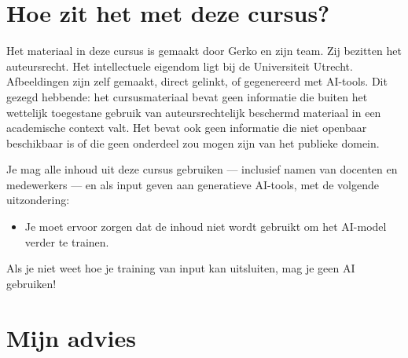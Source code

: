 \documentclass[
  letterpaper,
  DIV=11,
  numbers=noendperiod]{scrreprt}
\providecommand{\tightlist}{%
  \setlength{\itemsep}{0pt}\setlength{\parskip}{0pt}}
\begin{document}
\section*{Hoe zit het met deze
cursus?}\label{hoe-zit-het-met-deze-cursus}


Het materiaal in deze cursus is gemaakt door Gerko en zijn team. Zij
bezitten het auteursrecht. Het intellectuele eigendom ligt bij de
Universiteit Utrecht. Afbeeldingen zijn zelf gemaakt, direct gelinkt, of
gegenereerd met AI-tools. Dit gezegd hebbende: het cursusmateriaal bevat
geen informatie die buiten het wettelijk toegestane gebruik van
auteursrechtelijk beschermd materiaal in een academische context valt.
Het bevat ook geen informatie die niet openbaar beschikbaar is of die
geen onderdeel zou mogen zijn van het publieke domein.

\begin{tcolorbox}[enhanced jigsaw, arc=.35mm, bottomrule=.15mm, bottomtitle=1mm, breakable, colback=white, colbacktitle=quarto-callout-warning-color!10!white, colframe=quarto-callout-warning-color-frame, coltitle=black, left=2mm, leftrule=.75mm, opacityback=0, opacitybacktitle=0.6, rightrule=.15mm, title=\textcolor{quarto-callout-warning-color}{\faExclamationTriangle}\hspace{0.5em}{Warning}, titlerule=0mm, toprule=.15mm, toptitle=1mm]

Je mag alle inhoud uit deze cursus gebruiken --- inclusief namen van
docenten en medewerkers --- en als input geven aan generatieve AI-tools,
met de volgende uitzondering:

\begin{itemize}
\tightlist
\item
  Je moet ervoor zorgen dat de inhoud niet wordt gebruikt om het
  AI-model verder te trainen.
\end{itemize}

Als je niet weet hoe je training van input kan uitsluiten, mag je geen
AI gebruiken!

\end{tcolorbox}

\section*{Mijn advies}\label{mijn-advies}

\end{document}
